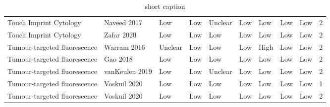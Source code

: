 \begin{table}[ht]
\begin{tabular}{llllllllll}
  Touch Imprint Cytology & Naveed 2017 & Low & Low & Unclear & Low & Low & Low & Low & 2 \\ 
  Touch Imprint Cytology & Zafar 2020 & Low & Low & Low & Low & Low & Low & Low & 2 \\ 
  Tumour-targeted fluorescence & Warram 2016 & Unclear & Low & Low & Low & High & Low & Low & 2 \\ 
  Tumour-targeted fluorescence & Gao 2018 & Low & Low & Low & Low & Low & Low & Low & 2 \\ 
  Tumour-targeted fluorescence & vanKeulen 2019 & Low & Low & Unclear & Low & Low & Low & Low & 2 \\ 
  Tumour-targeted fluorescence & Voskuil 2020 & Low & Low & Low & Low & Low & Low & Low & 1 \\ 
  Tumour-targeted fluorescence & Voskuil 2020 & Low & Low & Low & Low & Low & Low & Low & 2 \\ 
   \hline
\end{tabular}
\endgroup
\caption[full caption]{short caption} 
\label{tab:qual_scores}
\end{table}
